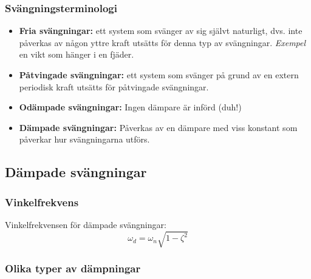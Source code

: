 \documentclass{article}
\newenvironment{ankiflashcard}[1]{}{}
\begin{document}
\begin{paracol}{2}
\subsubsection{Svängningsterminologi}

\begin{ankiflashcard}{Förklara vad dämpade och odämpade svängningar är samt vad fria och påtvingade svängningar är för något.}
\begin{itemize}
    \item \textbf{Fria svängningar: } ett system som svänger av sig självt naturligt, dvs. inte påverkas av någon yttre kraft utsätts för denna typ av svängningar.
    \textit{Exempel} en vikt som hänger i en fjäder.
    \item \textbf{Påtvingade svängningar: } ett system som svänger på grund av en extern periodisk kraft utsätts för påtvingade svängningar.
    \item \textbf{Odämpade svängningar: } Ingen dämpare är införd (duh!)
    \item \textbf{Dämpade svängningar: } Påverkas av en dämpare med viss konstant som påverkar hur svängningarna utförs.
\end{itemize}
\end{ankiflashcard}
\subsection{Dämpade svängningar}
\subsubsection{Vinkelfrekvens}

\begin{ankiflashcard}{Definiera vinkelfrekvens för dämpade svängningar}
    
Vinkelfrekvensen för dämpade svängningar: $$\omega_d = \omega_n \sqrt{1-\zeta^2}$$
\end{ankiflashcard}
\subsubsection{Olika typer av dämpningar}

\begin{ankiflashcard}{Definiera de olika typerna av dämpning. Ange hur de beter sig samt vad för typ av rötter de är kopplade till.}
    

\end{ankiflashcard}
\end{paracol}
\end{document}
